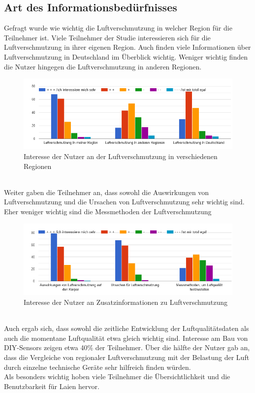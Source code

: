 \subsection{Art des Informationsbedürfnisses}
Gefragt wurde wie wichtig die Luftverschmutzung in welcher Region für die Teilnehmer ist.
Viele Teilnehmer der Studie interessieren sich für die Luftverschmutzung in ihrer eigenen Region. Auch finden viele Informationen über Luftverschmutzung in Deutschland im Überblick wichtig. Weniger wichtig finden die Nutzer hingegen die Luftverschmutzung in anderen Regionen.
\\
\begin{figure}[h]
    \centering
    \includegraphics[width=1\textwidth]{media/diagram/interesse.png}
    \caption{Interesse der Nutzer an der Luftverschmutzung in verschiedenen Regionen}
\end{figure}
\\
Weiter gaben die Teilnehmer an,  dass sowohl die Auswirkungen von Luftverschmutzung und die Ursachen von Luftverschmutzung sehr wichtig sind. Eher weniger wichtig sind die Messmethoden der Luftverschmutzung
\\
\begin{figure}[h]
    \centering
    \includegraphics[width=1\textwidth]{media/diagram/interesse2.png}
    \caption{Interesse der Nutzer an Zusatzinformationen zu Luftverschmutzung}
\end{figure}
\\
Auch ergab sich, dass sowohl die zeitliche Entwicklung der Luftqualitätsdaten als auch die momentane Luftqualität etwa gleich wichtig sind. Interesse am Bau von \gls{DIY}-\glspl{Sensor} zeigen etwa 40\%  der Teilnehmer.
Über die hälfte der Nutzer gab an, dass die Vergleiche von regionaler Luftverschmutzung mit der Belastung der Luft durch einzelne technische Geräte sehr hilfreich finden würden.
\\
Als besonders wichtig hoben viele Teilnehmer die Übersichtlichkeit und die Benutzbarkeit für Laien hervor.

